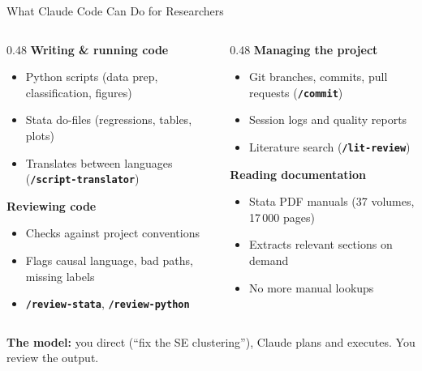 \documentclass[aspectratio=169,11pt,dvipsnames]{beamer}
\newcommand{\skill}[1]{\texttt{\textcolor{defaultclr}{\textbf{/#1}}}}
\begin{document}
\begin{frame}{What Claude Code Can Do for Researchers}
\scriptsize
  \begin{columns}[T]
    \begin{column}{0.48\textwidth}
      \textbf{Writing \& running code}
      \begin{itemize}
        \item Python scripts (data prep, classification, figures)
        \item Stata do-files (regressions, tables, plots)
        \item Translates between languages (\skill{script-translator})
      \end{itemize}
      \vspace{0.3cm}
      \textbf{Reviewing code}
      \begin{itemize}
        \item Checks against project conventions
        \item Flags causal language, bad paths, missing labels
        \item \skill{review-stata}, \skill{review-python}
      \end{itemize}
    \end{column}
    \begin{column}{0.48\textwidth}
      \textbf{Managing the project}
      \begin{itemize}
        \item Git branches, commits, pull requests (\skill{commit})
        \item Session logs and quality reports
        \item Literature search (\skill{lit-review})
      \end{itemize}
      \vspace{0.3cm}
      \textbf{Reading documentation}
      \begin{itemize}
        \item Stata PDF manuals (37 volumes, 17\,000 pages)
        \item Extracts relevant sections on demand
        \item No more manual lookups
      \end{itemize}
    \end{column}
  \end{columns}
  \vspace{0.3cm}
  \begin{greenbox}
    \small \textbf{The model:} you direct (``fix the SE clustering''),
    Claude plans and executes. You review the output.
  \end{greenbox}
\end{frame}
\end{document}

